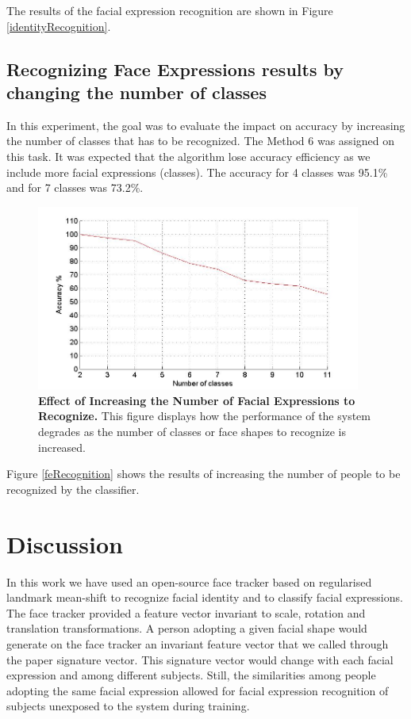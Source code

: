 \documentclass[]{article}
\begin{document}
The results of the facial expression recognition are shown in Figure
\ref{identityRecognition}.
 
\subsection{Recognizing Face Expressions results by changing the number of
classes}

In this experiment, the goal was to evaluate the impact on accuracy by
increasing  the number of classes that has to be recognized. The Method 6 was
assigned on this task. It was expected that the algorithm lose accuracy
efficiency as we include more facial expressions (classes). The accuracy for 4
classes was 95.1\% and for 7 classes was 73.2\%.


\begin{figure}[ht]
\begin{center}
\vspace{-3mm}
\includegraphics[width=0.95\textwidth]{figures/50people_increasing_classes.jpg}
\end{center}
\caption{\textbf{Effect of Increasing the Number of Facial Expressions to Recognize.} This figure displays how the 
performance of the system degrades as the number of classes or face shapes to recognize is increased. }
\label{increasingNumberExpressions}
\end{figure}

Figure \ref{feRecognition} shows the results of increasing the number of people
to be recognized by the classifier.


\section{Discussion}
In this work we have used an open-source face tracker based on regularised landmark mean-shift to recognize facial
identity and to classify facial expressions. The face tracker provided a feature vector invariant to scale, rotation and
translation transformations. A person adopting a given facial shape would generate on the face tracker an invariant
feature vector that we called through the paper signature vector. This signature vector would change with each facial
expression  and among different subjects. Still, the similarities among people adopting the same facial expression 
allowed for facial expression recognition of subjects unexposed to the system during training.
\end{document}
